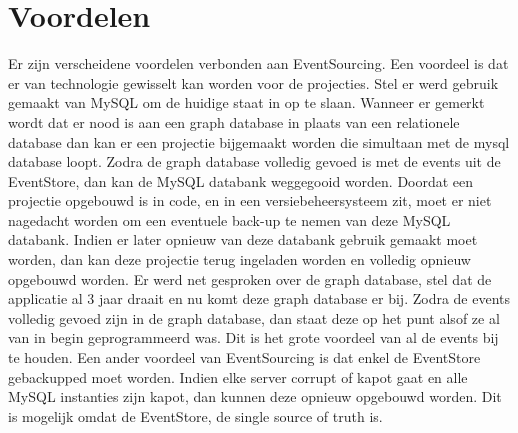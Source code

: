 
\chapter{Voordelen}
\label{ch:voordelen}

Er zijn verscheidene voordelen verbonden aan EventSourcing. Een voordeel is dat er van technologie gewisselt kan worden voor de projecties. Stel er werd gebruik gemaakt van MySQL om de huidige staat in op te slaan. Wanneer er gemerkt wordt dat er nood is aan een graph database in plaats van een relationele database dan kan er een projectie bijgemaakt worden die simultaan met de mysql database loopt. Zodra de graph database volledig gevoed is met de events uit de EventStore, dan kan de MySQL databank weggegooid worden. Doordat een projectie opgebouwd is in code, en in een versiebeheersysteem zit, moet er niet nagedacht worden om een eventuele back-up te nemen van deze MySQL databank. Indien er later opnieuw van deze databank gebruik gemaakt moet worden, dan kan deze projectie terug ingeladen worden en volledig opnieuw opgebouwd worden.
Er werd net gesproken over de graph database, stel dat de applicatie al 3 jaar draait en nu komt deze graph database er bij. Zodra de events volledig gevoed zijn in de graph database, dan staat deze op het punt alsof ze al van in begin geprogrammeerd was. Dit is het grote voordeel van al de events bij te houden.
Een ander voordeel van EventSourcing is dat enkel de EventStore gebackupped moet worden. Indien elke server corrupt of kapot gaat en alle MySQL instanties zijn kapot, dan kunnen deze opnieuw opgebouwd worden. Dit is mogelijk omdat de EventStore, de single source of truth is.